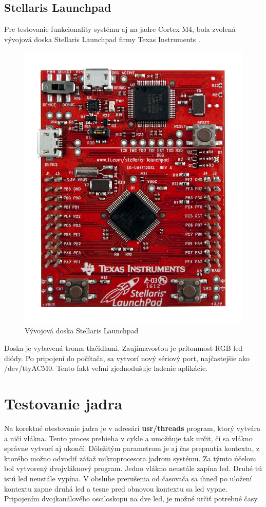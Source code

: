 \subsection {Stellaris Launchpad}

Pre testovanie funkcionality systému aj na jadre Cortex M4, bola zvolená vývojová doska Stellaris Launchpad firmy Texas Instruments \cite{stellaris_kit}.

\begin{figure}[ht]
\begin{center}
\begin{minipage}{1.1\linewidth}
\begin{center}
\includegraphics[width=.35\textwidth]{images/launchpad_lm4f120.jpg}
\caption{Vývojová doska Stellaris Launchpad}
\label{obr2}
\end{center}
\end{minipage}
\end{center}
\end{figure}

Doska je vybavená troma tlačidlami. Zaujímavosťou je prítomnosť RGB led diódy. Po pripojení do počítača, sa vytvorí nový sériový port, najčastejšie ako /dev/ttyACM0. Tento fakt veľmi zjednodušuje ladenie aplikácie.

\section {Testovanie jadra}

Na korektné otestovanie jadra je v adresári \textbf{usr/threads} program, ktorý vytvára a ničí vlákna. Tento proces prebieha v cykle a umožňuje tak určit, či sa vlákno správne vytvorí aj ukončí. Dôležitým parametrom je aj čas prepnutia kontextu, z ktorého možno odvodiť záťaž mikroprocesora jadrom systému. Za týmto účelom bol vytvorený dvojvláknový program. Jedno vlákno neustále zapína led. Druhé tú istú led neustále vypína. V obsluhe prerušenia od časovača sa ihneď po uložení kontextu zapne druhá led a tesne pred obnovou kontextu sa led vypne. Pripojením dvojkanálového osciloskopu na dve led, je možné určiť potrebné časy.

